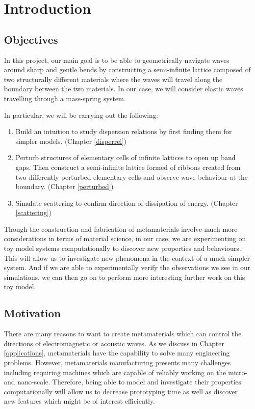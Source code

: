 \chapter{Introduction}

\section{Objectives}
In this project, our main goal is to be able to geometrically navigate waves
around sharp and gentle bends by constructing a semi-infinite lattice composed
of two structurally different materials where the waves will travel along the
boundary between the two materials. In our case, we will consider elastic waves
travelling through a mass-spring system.

In particular, we will be carrying out the following:

\begin{enumerate}
\item Build an intuition to study dispersion relations by first finding them
      for simpler models. (Chapter \ref{disperrel})
\item Perturb structures of elementary cells of infinite lattices to open up
      band gaps. Then construct a semi-infinite lattice formed of ribbons
      created from two differently perturbed elementary cells and observe wave
      behaviour at the boundary. (Chapter \ref{perturbed})
\item Simulate scattering to confirm direction of dissipation of energy.
      (Chapter \ref{scattering})
\end{enumerate}

Though the construction and fabrication of metamaterials involve much more
considerations in terms of material science, in our case, we are experimenting
on toy model systems computationally to discover new properties and behaviours.
This will allow us to investigate new phenomena in the context of a much
simpler system. And if we are able to experimentally verify the observations we
see in our simulations, we can then go on to perform more interesting further
work on this toy model.

\section{Motivation}
There are many reasons to want to create metamaterials which can control the
directions of electromagnetic or acoustic waves. As we discuss in Chapter
\ref{applications}, metamaterials have the capability to solve many engineering
problems. However, metamaterials manufacturing presents many challenges
including requiring machines which are capable of reliably working on the
micro- and nano-scale.\cite{metamanu} Therefore, being able to model and
investigate their properties computationally will allow us to decrease
prototyping time as well as discover new features which might be of interest
efficiently.
